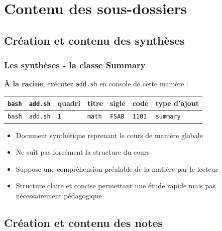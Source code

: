 \documentclass{beamer}
\begin{document}
\section{Contenu des sous-dossiers}
\label{addsh}

\subsection{Création et contenu des synthèses}

\begin{frame}
    \frametitle{Les synthèses - la classe Summary}
    \begin{exampleblock}{\textbf{À la racine}, exécutez \lstinline|add.sh| en
    console de cette manière :}
       \begin{tabular}{lllllll}
           \lstinline|bash| & \lstinline|add.sh| & quadri & titre & sigle & code & type d'ajout
           \\ \hline
           \lstinline|bash| & \lstinline|add.sh| & \lstinline|1| & \lstinline|math| & \lstinline|FSAB| & \lstinline|1101| & \lstinline|summary| \\
       \end{tabular}
    \end{exampleblock}
    \bigskip

    \begin{itemize}
        \item Document synthétique reprenant le cours de manière globale
        \item Ne suit pas forcément la structure du cours
        \item Suppose une compréhension préalable de la matière par le
            lecteur
        \item Structure claire et concise permettant une étude rapide
            mais pas nécessairement pédagogique
    \end{itemize}
\end{frame}

\subsection{Création et contenu des notes}
\end{document}
